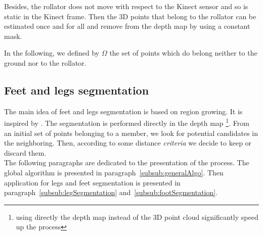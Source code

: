 \documentclass[letterpaper, 10 pt, conference]{ieeeconf}
\newcommand{\CDOK}[2]{{#1}} %
\begin{document}
Besides, the rollator does not move with respect to the Kinect sensor and so is static in the Kinect frame. Then the 3D points that belong to the rollator can be estimated once and for all and remove from the depth map by using a constant mask.

In the following, we defined by $\Omega$ the set of points which do belong neither to the ground nor to the rollator. 


\subsection{Feet and legs segmentation}

The main idea of feet and legs segmentation is based on region growing. It is inspired by \cite{Leonardis97}. \CDOK{The segmentation is performed directly in the depth map \footnote{using directly the depth map instead of the 3D point cloud significantly speed up the process}}{}. From \CDOK{an initial}{a current} set of points \CDOK{belonging to}{of} a member, we look for potential candidates in the neighboring\CDOK{. Then, according to some distance \textit{criteria} we decide to keep or discard them. \\}{ and then validate it or not. } The following paragraphs are dedicated to the presentation of the process. The global algorithm is presented in paragraph~\ref{subsub:generalAlgo}. Then application for legs and feet segmentation is presented in paragraph~\ref{subsub:legSegmentation} and~\ref{subsub:footSegmentation}.
\end{document}
